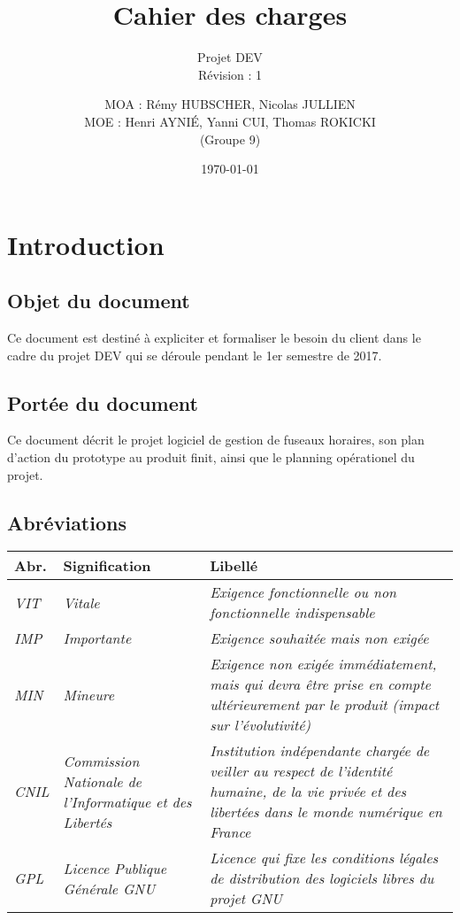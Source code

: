 \documentclass[majeure,gl]{tb}
\date{\today}
\title[Cahier des charges]{Cahier des charges}
\subtitle{Projet DEV \\ Révision : 1}
\author{MOA : Rémy HUBSCHER, Nicolas JULLIEN \\ MOE : Henri AYNIÉ, Yanni CUI, Thomas ROKICKI \\ \small(Groupe 9)}
\begin{document}
\maketitle

\clearpage
\renewcommand\contentsname{Sommaire}
\tableofcontents

\clearpage

\clearpage
\section{Introduction}

\subsection{Objet du document}

Ce document est destiné à expliciter et formaliser le besoin du client
dans le cadre du projet DEV qui se déroule pendant le 1er semestre de
2017.


\subsection{Portée du document}

Ce document décrit le projet logiciel de gestion de fuseaux horaires,
son plan d'action du prototype au produit finit, ainsi que le planning
opérationel du projet.

\subsection{Abréviations}
\label{sec:abreviation}

\begin{tabular}[c]{|p{1cm}|p{2.6cm}|p{12.4cm}|}
  \hline
  \textbf{Abr.} & \textbf{Signification} & \textbf{Libellé}
  \\\hline
  \textit{VIT} & \textit{Vitale} & \textit{Exigence fonctionnelle ou non fonctionnelle indispensable}
  \\\hline
  \textit{IMP} & \textit{Importante} & \textit{Exigence souhaitée mais non exigée}
  \\\hline
  \textit{MIN} & \textit{Mineure} &
  \textit{Exigence non exigée immédiatement, mais qui devra être prise en compte
    ultérieurement par le produit (impact sur l'évolutivité)}
  \\\hline
  \textit{CNIL} & \textit{Commission Nationale de l'Informatique et des Libertés} &
  \textit{Institution indépendante chargée de veiller au respect de l'identité humaine, de la vie privée et des libertées dans le monde numérique en France}
  \\\hline
  \textit{GPL} & \textit{Licence Publique Générale GNU} &
  \textit{Licence qui fixe les conditions légales de distribution des logiciels libres du projet GNU}
  \\\hline
\end{tabular}
\end{document}
